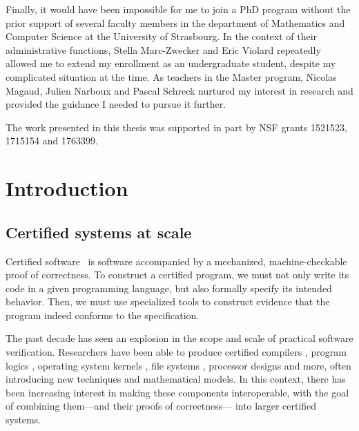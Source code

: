 \documentclass[11pt,oneside]{book}
\theoremstyle{definition}
\begin{document}
Finally,
it would have been impossible for me
to join a PhD program without the prior support of
several faculty members
in the department of Mathematics and Computer Science
at the University of Strasbourg.
In the context of their administrative functions,
Stella Marc-Zwecker and Eric Violard
repeatedly
allowed me to extend my enrollment as an undergraduate student,
despite my complicated situation at the time.
As teachers in the Master program,
Nicolas Magaud,
Julien Narboux and
Pascal Schreck
nurtured my interest in research
and provided the guidance I needed
to pursue it further.

The work presented in this thesis was
supported in part by NSF grants 1521523, 1715154 and 1763399.


\mainmatter

\chapter{Introduction} %

\section{Certified systems at scale} %
\label{ssec:certsys}


Certified software~\citep{shao10}
is software accompanied by
a mechanized, machine-checkable proof of correctness.
To construct a certified program,
we must not only write its code in a given programming language,
but also formally specify its intended behavior.
Then,
we must use specialized tools
to construct evidence that the program
indeed conforms to the specification.


The past decade has seen an explosion
in the scope and scale of practical software verification.
Researchers have been able to produce certified
compilers \citep{compcert},
program logics \citep{vst},
operating system kernels \citep{sel4,popl15},
file systems \citep{fscq},
processor designs \citep{safe,kami} and
more,
often introducing new techniques
and mathematical models.
In this context,
there has been increasing interest in
making these components
interoperable,
with the goal of
combining them---and their proofs of correctness---%
into larger certified systems.
\end{document}
